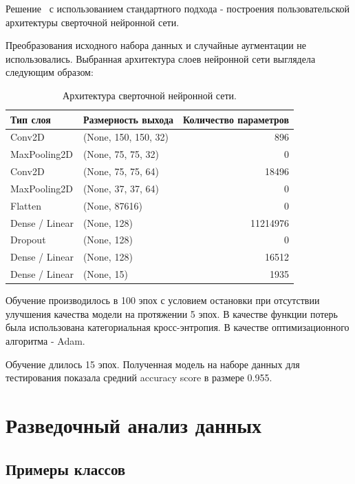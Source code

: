 \documentclass[a4paper,12pt]{extarticle}
\begin{document}
Решение~\cite{example_3} с использованием стандартного подхода - построения пользовательской
архитектуры сверточной нейронной сети.

Преобразования исходного набора данных и случайные аугментации не использовались. Выбранная
архитектура слоев нейронной сети выглядела следующим образом:

\begin{table}[ht]
	\caption{Архитектура сверточной нейронной сети.}
	\label{table:example_3_arch}
	\footnotesize
	\centering
	\begin{tabular}{ |l|l|r| }
		\hline
		Тип слоя & Размерность выхода & Количество параметров \\ [0.5ex]
		\hline\hline
		Conv2D & (None, 150, 150, 32) & 896 \\
		\hline
		MaxPooling2D & (None, 75, 75, 32) & 0 \\
		\hline
		Conv2D & (None, 75, 75, 64) & 18496 \\
		\hline
		MaxPooling2D & (None, 37, 37, 64) & 0 \\
		\hline
		Flatten & (None, 87616) & 0 \\
		\hline
		Dense / Linear & (None, 128) & 11214976 \\
		\hline
		Dropout & (None, 128) & 0 \\
		\hline
		Dense / Linear & (None, 128) & 16512 \\
		\hline
		Dense / Linear & (None, 15) & 1935 \\
		\hline
	\end{tabular}
\end{table}

Обучение производилось в 100 эпох с условием остановки при отсутствии улучшения качества модели на
протяжении 5 эпох. В качестве функции потерь была использована категориальная кросс-энтропия.
В качестве оптимизационного алгоритма - Adam.

Обучение длилось 15 эпох. Полученная модель на наборе данных для тестирования показала средний
accuracy score в размере 0.955.

\newpage
\section{Разведочный анализ данных}

\subsection{Примеры классов}
\end{document}
